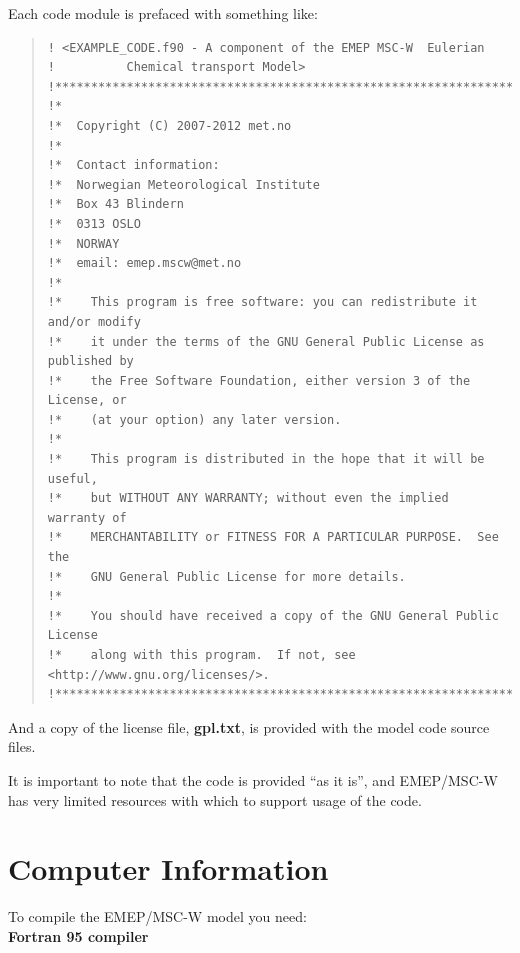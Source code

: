 Each code module is prefaced with something like:
\begin{quote}
\begin{small}
\begin{verbatim}
! <EXAMPLE_CODE.f90 - A component of the EMEP MSC-W  Eulerian
!          Chemical transport Model>
!*****************************************************************************!
!*
!*  Copyright (C) 2007-2012 met.no
!*
!*  Contact information:
!*  Norwegian Meteorological Institute
!*  Box 43 Blindern
!*  0313 OSLO
!*  NORWAY
!*  email: emep.mscw@met.no
!*
!*    This program is free software: you can redistribute it and/or modify
!*    it under the terms of the GNU General Public License as published by
!*    the Free Software Foundation, either version 3 of the License, or
!*    (at your option) any later version.
!*
!*    This program is distributed in the hope that it will be useful,
!*    but WITHOUT ANY WARRANTY; without even the implied warranty of
!*    MERCHANTABILITY or FITNESS FOR A PARTICULAR PURPOSE.  See the
!*    GNU General Public License for more details.
!*
!*    You should have received a copy of the GNU General Public License
!*    along with this program.  If not, see <http://www.gnu.org/licenses/>.
!*****************************************************************************!
\end{verbatim}
\end{small}
\end{quote}
And a copy of the license file, {\bf gpl.txt}, is provided with the
model code source files.

\noindent It is important to note that the code is provided ``as it is'', 
and EMEP/MSC-W has very limited resources with which to support
usage of the code. 


\newpage

\section{Computer Information}
\label{sec:compinf}

To compile the EMEP/MSC-W model you need:\\

\textbf{Fortran 95 compiler}

